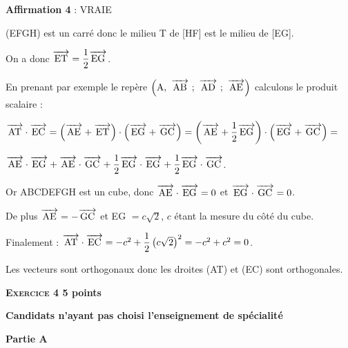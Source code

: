 \documentclass[10pt]{article}
\newcommand{\vect}[1]{\overrightarrow{\,\mathstrut#1\,}}
\begin{document}
\begin{enumerate}
\textbf{Affirmation 4} : VRAIE %

(EFGH) est un carré donc le milieu T de [HF] est le milieu de [EG].

On a donc $\vect{\text{ET}} = \dfrac{1}{2}\vect{\text{EG}}$.

En prenant par exemple le repère $\left(\text{A},~\vect{\text{AB}}~;~\vect{\text{AD}}~;~\vect{\text{AE}}\right)$ calculons le produit scalaire :

$\vect{\text{AT}} \cdot \vect{\text{EC}} = \left(\vect{\text{AE}} + \vect{\text{ET}} \right) \cdot \left(\vect{\text{EG}} + \vect{\text{GC}} \right) = 
\left(\vect{\text{AE}} + \dfrac{1}{2}\vect{\text{EG}} \right) \cdot \left(\vect{\text{EG}} + \vect{\text{GC}} \right) =$
 
$\vect{\text{AE}}\cdot \vect{\text{EG}} + \vect{\text{AE}} \cdot \vect{\text{GC}} + \dfrac{1}{2}\vect{\text{EG}} \cdot \vect{\text{EG}} + \dfrac{1}{2}\vect{\text{EG}}\cdot\vect{\text{GC}}$.

Or ABCDEFGH est un cube, donc $\vect{\text{AE}} \cdot \vect{\text{EG}} = 0$ et $\vect{\text{EG}} \cdot \vect{\text{GC}} = 0$.

De plus $\vect{\text{AE}} = - \vect{\text{GC}}$ et EG $ = c\sqrt{2}$, $c$ étant la mesure du côté du cube.

Finalement : $\vect{\text{AT}} \cdot \vect{\text{EC}} = - c^2  + \dfrac{1}{2}\left(c \sqrt{2} \right)^2 = - c^2 + c^2 = 0$.

Les vecteurs sont orthogonaux donc les droites (AT) et (EC) sont orthogonales.
\end{enumerate}

\vspace{0,5cm}

\textbf{\textsc{Exercice 4} \hfill 5 points}

\textbf{Candidats n'ayant pas choisi l'enseignement de spécialité}  

\bigskip

\textbf{Partie A}

\medskip
 
%
% 
%
 
\end{document}
